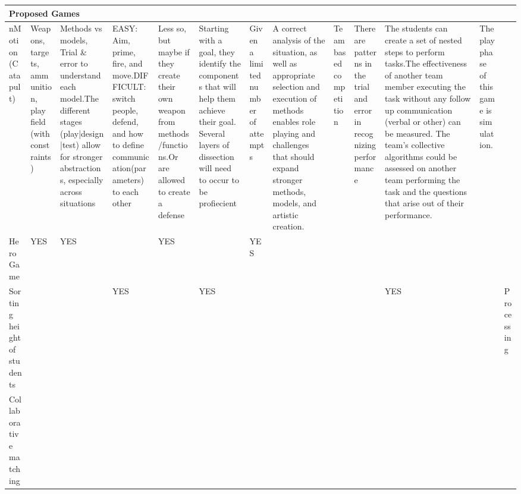 \documentclass{acm_proc_article-sp}
\begin{document}
\begin{sidewaystable}[htbp]
\begin{tabular}{|p{1.3cm}||p{1cm}|p{2cm}|p{2cm}|p{1.6cm}|p{2cm}|p{1cm}|p{2cm}|p{1cm}|p{1.3cm}|p{2.7cm}|p{1cm}|p{1.6cm}|}
    \hline
    \multicolumn{13}{|l|}{Proposed Games} \\ \hline \hline

    nMotion (Catapult) & Weapons, targets, ammunition, play field (with constraints) & Methods vs models, Trial \& error to understand each model.\newline \newline The different stages (play|design|test) allow for stronger abstractions, especially across situations & EASY: Aim, prime, fire, and move.\newline \newline DIFFICULT: switch people, defend, and how to define communication(parameters) to each other & Less so, but maybe if they create their own weapon from methods/functions.\newline \newline Or are allowed to create a defense & Starting with a goal, they identify the components that will help them achieve their goal.   Several layers of dissection will need to occur to be profiecient & Given a limited number of attempts & A correct analysis of the situation, as well as appropriate selection and execution of methods enables role playing and challenges that should expand stronger methods, models, and artistic creation. & Team based competition & There are patterns in the trial and error in recognizing performance & The students can create a set of nested steps to perform tasks.\newline \newline The effectiveness of another team member executing the task without any follow up communication (verbal or other) can be measured. The team's collective algorithms could be assessed on another team performing the task and the questions that arise out of their performance. & The play phase of this game is simulation. & ~ \\ \hline
    
    Hero Game & \cellcolor{blue!25}YES & \cellcolor{blue!25}YES & ~ & \cellcolor{blue!25}YES & ~ & \cellcolor{blue!25}YES & ~ & ~ & ~ & ~ & ~ & ~ \\ \hline
    
    Sorting height of students & ~ & ~ & \cellcolor{blue!25}YES & ~ & \cellcolor{blue!25}YES & ~ & ~ & ~ & ~ & \cellcolor{blue!25}YES & ~ & Processing \\ \hline
    
    Collaborative matching & ~ & ~ & ~ & ~ & ~ & ~ & ~ & ~ & ~ & ~ & ~ & ~ \\ \hline
    

\end{tabular}
\end{sidewaystable}
\end{document}
